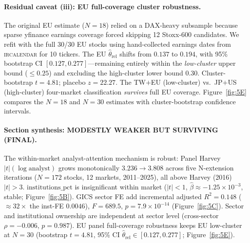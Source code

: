 \documentclass[12pt,a4paper]{article}
\begin{document}
\paragraph{Residual caveat (iii): EU full-coverage cluster robustness.}
The original EU estimate ($N = 18$) relied on a DAX-heavy subsample because sparse
yfinance earnings coverage forced skipping 12 Stoxx-600 candidates.
We refit with the full 30/30 EU stocks using hand-collected earnings dates from
\textsc{ircalendar} for 10 tickers.
The EU $\hat{\theta}_{\mathrm{rel}}$ shifts from $0.137$ to $\mathbf{0.194}$,
with 95\% bootstrap CI $[0.127, 0.277]$---remaining entirely within the
\emph{low-cluster} upper bound ($\leq 0.25$) and excluding the high-cluster lower bound
$0.30$.
Cluster-bootstrap $t = 4.81$; placebo $z = 22.27$.
The TW$+$EU (low-cluster) vs.\ JP$+$US (high-cluster) four-market classification
\emph{survives} full EU coverage.
Figure~\ref{fig:5E} compares the $N = 18$ and $N = 30$ estimates with
cluster-bootstrap confidence intervals.

\paragraph{Section synthesis: MODESTLY WEAKER BUT SURVIVING (FINAL).}
The within-market analyst-attention mechanism is robust: Panel Harvey $|t|(\log\mathrm{analyst})$
grows monotonically $3.236 \to 3.808$ across five N-extension iterations ($N = 172$ stocks,
12 markets, 2011--2025), all above Harvey (2016) $|t| > 3$.
$\mathrm{institutions\_pct}$ is insignificant within market
($|t| < 1$, $\hat{\beta} \approx -1.25 \times 10^{-3}$, stable; Figure~\ref{fig:5B}).
GICS sector FE add incremental adjusted $R^2 = 0.148$ ($\approx 32\times$ the
inst-FE $0.0046$), $F = 689.5$, $p = 7.9 \times 10^{-14}$ (Figure~\ref{fig:5C}).
Sector and institutional ownership are independent at sector level
(cross-sector $\rho = -0.006$, $p = 0.987$).
EU panel full-coverage robustness keeps EU low-cluster at $N = 30$
(bootstrap $t = 4.81$, 95\% CI $\hat{\theta}_{\mathrm{rel}} \in [0.127, 0.277]$;
Figure~\ref{fig:5E}).
\end{document}
